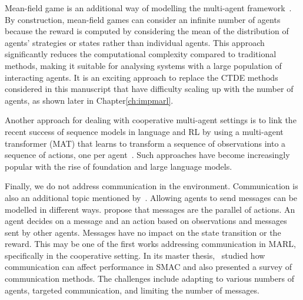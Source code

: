 Mean-field game is an additional way of modelling the multi-agent framework~\citep{lauriere2022learning}.
By construction, mean-field games can consider an infinite number of agents because the reward is computed by considering the mean of the distribution of agents' strategies or states rather than individual agents.
This approach significantly reduces the computational complexity compared to traditional methods, making it suitable for analysing systems with a large population of interacting agents.
It is an exciting approach to replace the CTDE methods considered in this manuscript that have difficulty scaling up with the number of agents, as shown later in Chapter\ref{ch:impmarl}.

Another approach for dealing with cooperative multi-agent settings is to link the recent success of sequence models in language and RL by using a multi-agent transformer (MAT) that learns to transform a sequence of observations into a sequence of actions, one per agent~\citep{wen2022multiagent}.
Such approaches have become increasingly popular with the rise of foundation and large language models.

Finally, we do not address communication in the environment.
Communication is also an additional topic mentioned by~\citep{DecPomdp}.
Allowing agents to send messages can be modelled in different ways.
\cite{foerster2016learning} propose that messages are the parallel of actions.
An agent decides on a message and an action based on observations and messages sent by other agents.
Messages have no impact on the state transition or the reward.
This may be one of the first works addressing communication in MARL, specifically in the cooperative setting.
In its master thesis,~\cite{fombellida2020master} studied how communication can affect performance in SMAC and also presented a survey of communication methods.
The challenges include adapting to various numbers of agents, targeted communication, and limiting the number of messages.